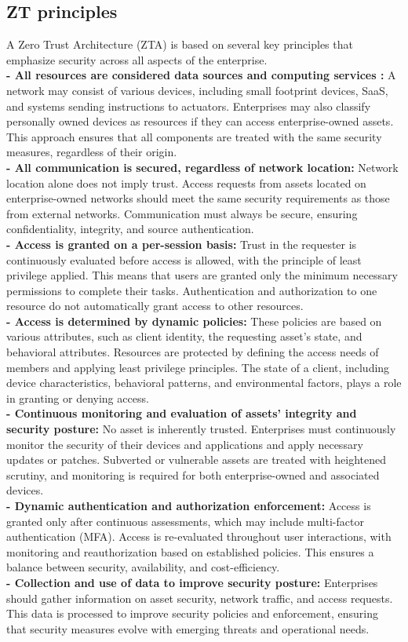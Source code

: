 \documentclass{report}
\begin{document}
\subsection{ZT principles}
A Zero Trust Architecture (ZTA) is based on several key principles that emphasize security across all aspects of the enterprise.\cite{stafford2020zero} \\
\textbf{- All resources are considered data sources and computing services :} A network may consist of various devices, including small footprint devices, SaaS, and systems sending instructions to actuators. Enterprises may also classify personally owned devices as resources if they can access enterprise-owned assets. This approach ensures that all components are treated with the same security measures, regardless of their origin.\\
\textbf{- All communication is secured, regardless of network location: } Network location alone does not imply trust. Access requests from assets located on enterprise-owned networks should meet the same security requirements as those from external networks. Communication must always be secure, ensuring confidentiality, integrity, and source authentication.\\
\textbf{- Access is granted on a per-session basis:} Trust in the requester is continuously evaluated before access is allowed, with the principle of least privilege applied. This means that users are granted only the minimum necessary permissions to complete their tasks. Authentication and authorization to one resource do not automatically grant access to other resources.\\
\textbf{- Access is determined by dynamic policies:} These policies are based on various attributes, such as client identity, the requesting asset’s state, and behavioral attributes. Resources are protected by defining the access needs of members and applying least privilege principles. The state of a client, including device characteristics, behavioral patterns, and environmental factors, plays a role in granting or denying access.\\
\textbf{- Continuous monitoring and evaluation of assets' integrity and security posture:} No asset is inherently trusted. Enterprises must continuously monitor the security of their devices and applications and apply necessary updates or patches. Subverted or vulnerable assets are treated with heightened scrutiny, and monitoring is required for both enterprise-owned and associated devices.\\
\textbf{- Dynamic authentication and authorization enforcement:} Access is granted only after continuous assessments, which may include multi-factor authentication (MFA). Access is re-evaluated throughout user interactions, with monitoring and reauthorization based on established policies. This ensures a balance between security, availability, and cost-efficiency.\\
\textbf{- Collection and use of data to improve security posture:} Enterprises should gather information on asset security, network traffic, and access requests. This data is processed to improve security policies and enforcement, ensuring that security measures evolve with emerging threats and operational needs.
\end{document}

